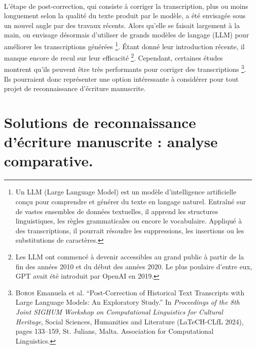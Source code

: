 \documentclass[a4paper,12pt,twoside]{book}
\begin{document}
\paragraph{}
L'étape de post-correction, qui consiste à corriger la transcription, plus ou moins longuement selon la qualité du texte produit par le modèle, a été envisagée sous un nouvel angle par des travaux récents. Alors qu'elle se faisait largement à la main, on envisage désormais d'utiliser de grands modèles de langage (LLM) pour améliorer les transcriptions générées \footnote{Un LLM (Large Language Model) est un modèle d'intelligence artificielle conçu pour comprendre et générer du texte en langage naturel. Entraîné sur de vastes ensembles de données textuelles, il apprend les structures linguistiques, les règles grammaticales ou encore le vocabulaire. Appliqué à des transcriptions, il pourrait résoudre les suppressions, les insertions ou les substitutions de caractères.}. Étant donné leur introduction récente, il manque encore de recul sur leur efficacité \footnote{Les LLM  ont commencé à devenir accessibles au grand public à partir de la fin des années 2010 et du début des années 2020. Le plus poulaire d'entre eux, GPT avait été introduit par OpenAI en 2019.}. Cependant, certaines études montrent qu'ils peuvent être très performants pour corriger des transcriptions \footnote{\textsc{Boros} Emanuela et al. \enquote{Post-Correction of Historical Text Transcripts with Large Language Models: An Exploratory Study.} In \textit{Proceedings of the 8th Joint SIGHUM Workshop on Computational Linguistics for Cultural Heritage}, Social Sciences, Humanities and Literature (LaTeCH-CLfL 2024), pages 133–159, St. Julians, Malta. Association for Computational Linguistics.}. Ils pourraient donc représenter une option intéressante à considérer pour tout projet de reconnaissance d'écriture manuscrite.


	
	\section{Solutions de reconnaissance d'écriture manuscrite : analyse comparative.}
	
\end{document}
